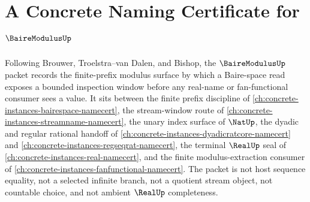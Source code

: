 \chapter{A Concrete Naming Certificate for $\BaireModulusUp$}
\label{ch:concrete-instances-baire-modulus-namecert}

Following Brouwer, Troelstra--van Dalen, and Bishop, the $\BaireModulusUp$ packet records the finite-prefix modulus surface by which a Baire-space read exposes a bounded inspection window before any real-name or fan-functional consumer sees a value. It sits between the finite prefix discipline of \autoref{ch:concrete-instances-bairespace-namecert}, the stream-window route of \autoref{ch:concrete-instances-streamname-namecert}, the unary index surface of $\NatUp$, the dyadic and regular rational handoff of \autoref{ch:concrete-instances-dyadicratcore-namecert} and \autoref{ch:concrete-instances-regseqrat-namecert}, the terminal $\RealUp$ seal of \autoref{ch:concrete-instances-real-namecert}, and the finite modulus-extraction consumer of \autoref{ch:concrete-instances-fanfunctional-namecert}. The packet is not host sequence equality, not a selected infinite branch, not a quotient stream object, not countable choice, and not ambient $\RealUp$ completeness.


